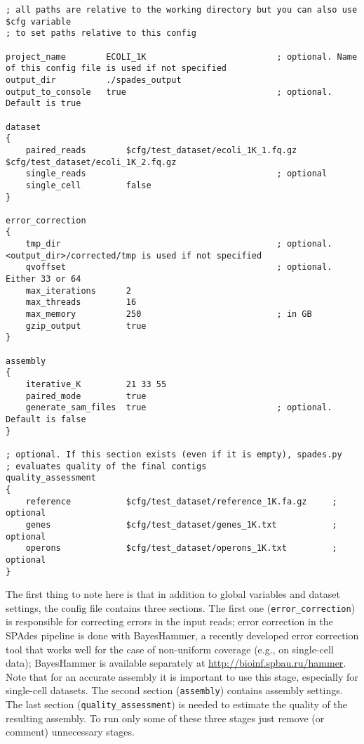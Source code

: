 \documentclass{article}
\def\spades{SPAdes}
\def\bh{BayesHammer}
\begin{document}
\begin{lstlisting}													
; all paths are relative to the working directory but you can also use $cfg variable 
; to set paths relative to this config

project_name        ECOLI_1K                          ; optional. Name of this config file is used if not specified
output_dir          ./spades_output
output_to_console   true                              ; optional. Default is true

dataset
{
    paired_reads        $cfg/test_dataset/ecoli_1K_1.fq.gz $cfg/test_dataset/ecoli_1K_2.fq.gz
    single_reads                                      ; optional
    single_cell         false
}

error_correction
{
    tmp_dir                                           ; optional. <output_dir>/corrected/tmp is used if not specified
    qvoffset                                          ; optional. Either 33 or 64
    max_iterations      2
    max_threads         16
    max_memory          250                           ; in GB
    gzip_output         true
}

assembly
{
    iterative_K         21 33 55
    paired_mode         true
    generate_sam_files  true                          ; optional. Default is false
}

; optional. If this section exists (even if it is empty), spades.py 
; evaluates quality of the final contigs
quality_assessment      
{
    reference           $cfg/test_dataset/reference_1K.fa.gz     ; optional
    genes               $cfg/test_dataset/genes_1K.txt           ; optional
    operons             $cfg/test_dataset/operons_1K.txt         ; optional
}
\end{lstlisting}

The first thing to note here is that in addition to global variables and dataset settings,
the config file contains three sections. The first one ({\tt error\_correction}) is responsible for correcting errors in the input reads;
error correction in the {\spades} pipeline is done with {\bh}, a recently developed error correction tool that works well for the case of non-uniform coverage
(e.g., on single-cell data); {\bh} is available separately at \url{http://bioinf.spbau.ru/hammer}.
Note that for an accurate assembly it is important to use this stage, especially for single-cell datasets.
The second section ({\tt assembly}) contains assembly settings. The last section ({\tt quality\_assessment})
is needed to estimate the quality of the resulting assembly. To run only some of these three stages just remove (or comment) unnecessary stages.
\end{document}
